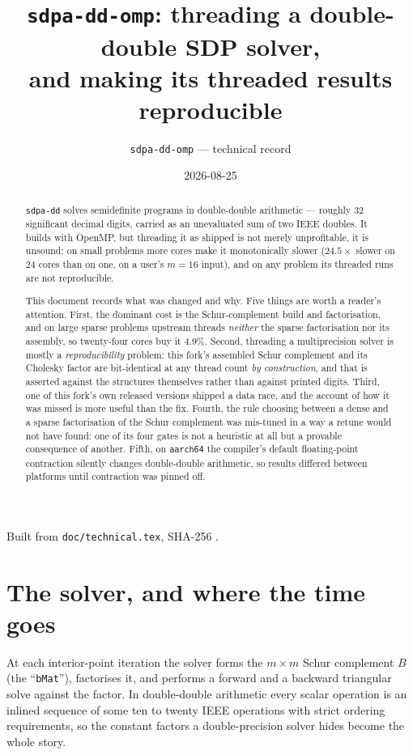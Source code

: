 \documentclass[11pt]{article}
\title{\texttt{sdpa-dd-omp}: threading a double-double SDP solver,\\
and making its threaded results reproducible}
\author{\texttt{sdpa-dd-omp} --- technical record}
\date{2026-08-25}
\newcommand{\bMat}{B}
\newcommand{\code}[1]{\texttt{#1}}
\begin{document}
\maketitle
\begin{center}\footnotesize
Built from \code{doc/technical.tex}, SHA-256 \code{\SourceHash}.
\end{center}

\begin{abstract}
\noindent
\code{sdpa-dd} solves semidefinite programs in double-double arithmetic --- roughly $32$
significant decimal digits, carried as an unevaluated sum of two IEEE doubles. It builds with
OpenMP, but threading it as shipped is not merely unprofitable, it is unsound: on small problems
more cores make it monotonically slower ($24.5\times$ slower on $24$ cores than on one, on a
user's $m{=}16$ input), and on any problem its threaded runs are not reproducible.

This document records what was changed and why. Five things are worth a reader's attention.
First, the dominant cost is the Schur-complement build and factorisation, and on large sparse
problems upstream threads \emph{neither} the sparse factorisation nor its assembly, so
twenty-four cores buy it $4.9\%$. Second, threading a multiprecision solver is mostly a
\emph{reproducibility} problem: this fork's assembled Schur complement and its Cholesky factor are
bit-identical at any thread count \emph{by construction}, and that is asserted against the
structures themselves rather than against printed digits. Third, one of this fork's own released
versions shipped a data race, and the account of how it was missed is more useful than the fix.
Fourth, the rule choosing between a dense and a sparse factorisation of the Schur complement was
mis-tuned in a way a retune would not have found: one of its four gates is not a heuristic at all
but a provable consequence of another. Fifth, on \code{aarch64} the compiler's default
floating-point contraction silently changes double-double arithmetic, so results differed between
platforms until contraction was pinned off.
\end{abstract}

\tableofcontents

\newpage

\section{The solver, and where the time goes}

At each interior-point iteration the solver forms the $m \times m$ Schur complement $\bMat$ (the
``\code{bMat}''), factorises it, and performs a forward and a backward triangular solve against
the factor. In double-double arithmetic every scalar operation is an inlined sequence of some ten
to twenty IEEE operations with strict ordering requirements, so the constant factors a
double-precision solver hides become the whole story.
\end{document}
